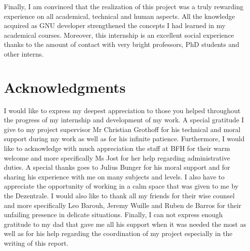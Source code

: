 Finally, I am convinced that the realization of this project was a truly rewarding experience on all academical, technical and human aspects. All the knowledge acquired as GNU developer strengthened the concepts I had learned in my academical courses. Moreover, this internship is an excellent social experience thanks to the amount of contact with very bright professors, PhD students and other interns.     
   
\clearpage

\section{Acknowledgments}

I would like to express my deepest appreciation to those you helped throughout the progress of my internship and development of my work.
A special gratitude I give to my project supervisor Mr Christian Grothoff for his technical and moral support during my work as well as for his infinite patience.
Furthermore, I would like to acknowledge with much appreciation the staff at BFH for their warm welcome and more specifically Ms Jost for her help regarding administrative duties.
A special thanks goes to Julius Bunger for his moral support and for sharing his experience with me on many subjects and levels.
I also have to appreciate the opportunity of working in a calm space that was given to me by the Dezentrale.
I would also like to thank all my friends for their wise counsel and more specifically Leo Barouh, Jeremy Wuille and Ruben de Barros for their unfailing presence in delicate situations.   
Finally, I can not express enough gratitude to my dad that gave me all his support when it was needed the most as well as for his help regarding the coordination of my project especially in the writing of this report.        